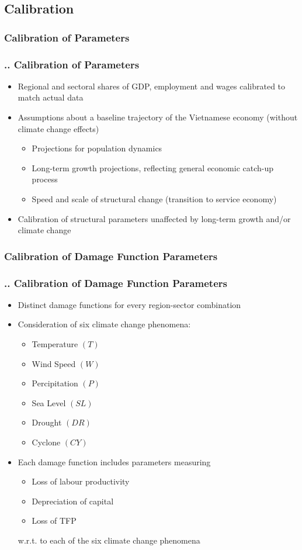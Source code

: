 \documentclass[11pt,aspectratio=169]{beamer}
\begin{document}
\subsection{Calibration}
\subsubsection{Calibration of Parameters}
\begin{frame}
\frametitle{{\thesection.\thesubsection.\thesubsubsection} Calibration of Parameters}
\begin{itemize}
\item Regional and sectoral shares of GDP, employment and wages calibrated to match actual data
\item Assumptions about a baseline trajectory of the Vietnamese economy (without climate change effects)
	\begin{itemize}
		\item Projections for population dynamics
		\item Long-term growth projections, reflecting general economic catch-up process
		\item Speed and scale of structural change (transition to service economy)
\end{itemize}
\item Calibration of structural parameters unaffected by long-term growth and/or climate change
\end{itemize}
\end{frame}

\subsubsection{Calibration of Damage Function Parameters}
\begin{frame}
\frametitle{{\thesection.\thesubsection.\thesubsubsection} Calibration of Damage Function Parameters}
\begin{itemize}
\item Distinct damage functions for every region-sector combination 
\item Consideration of six climate change phenomena:
	\begin{itemize}
		\item Temperature $(T)$
		\item Wind Speed $(W)$
		\item Percipitation $(P)$
		\item Sea Level $(SL)$
		\item Drought $(DR)$
		\item Cyclone $(CY)$
	\end{itemize}
\item Each damage function includes parameters measuring 
	\begin{itemize}
		\item Loss of labour productivity 
		\item Depreciation of capital
		\item Loss of TFP
	\end{itemize}
w.r.t. to each of the six climate change phenomena
\end{itemize}
\end{frame}
\end{document}
